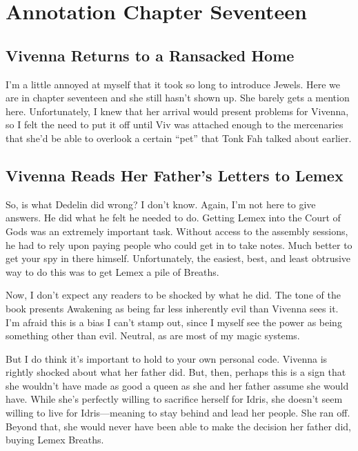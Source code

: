 \section{Annotation Chapter Seventeen}

\subsection*{Vivenna Returns to a Ransacked Home}

I’m a little annoyed at myself that it took so long to introduce Jewels. Here we are in chapter seventeen and she still hasn’t shown up. She barely gets a mention here. Unfortunately, I knew that her arrival would present problems for Vivenna, so I felt the need to put it off until Viv was attached enough to the mercenaries that she’d be able to overlook a certain “pet” that Tonk Fah talked about earlier.

\subsection*{Vivenna Reads Her Father’s Letters to Lemex}

So, is what Dedelin did wrong? I don’t know. Again, I’m not here to give answers. He did what he felt he needed to do. Getting Lemex into the Court of Gods was an extremely important task. Without access to the assembly sessions, he had to rely upon paying people who could get in to take notes. Much better to get your spy in there himself. Unfortunately, the easiest, best, and least obtrusive way to do this was to get Lemex a pile of Breaths.

Now, I don’t expect any readers to be shocked by what he did. The tone of the book presents Awakening as being far less inherently evil than Vivenna sees it. I’m afraid this is a bias I can’t stamp out, since I myself see the power as being something other than evil. Neutral, as are most of my magic systems.

But I do think it’s important to hold to your own personal code. Vivenna is rightly shocked about what her father did. But, then, perhaps this is a sign that she wouldn’t have made as good a queen as she and her father assume she would have. While she’s perfectly willing to sacrifice herself for Idris, she doesn’t seem willing to live for Idris—meaning to stay behind and lead her people. She ran off. Beyond that, she would never have been able to make the decision her father did, buying Lemex Breaths.



